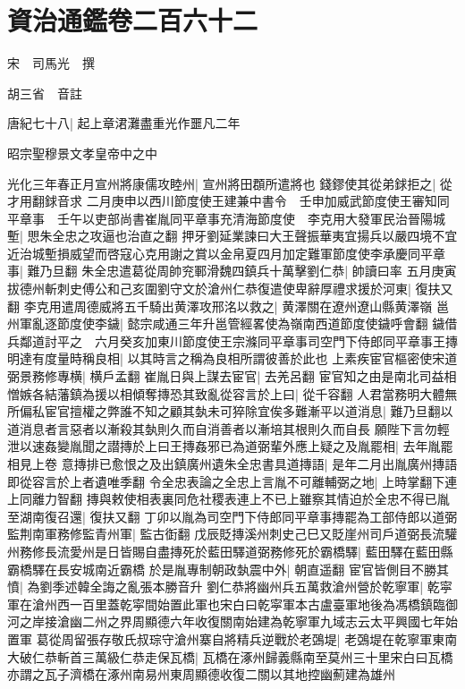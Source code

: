 \chapter{資治通鑑卷二百六十二}
宋　司馬光　撰

胡三省　音註

唐紀七十八|{
	起上章涒灘盡重光作噩凡二年}


昭宗聖穆景文孝皇帝中之中

光化三年春正月宣州將康儒攻睦州|{
	宣州將田頵所遣將也}
錢鏐使其從弟銶拒之|{
	從才用翻銶音求}
二月庚申以西川節度使王建兼中書令　壬申加威武節度使王審知同平章事　壬午以吏部尚書崔胤同平章事充清海節度使　李克用大發軍民治晉陽城塹|{
	愳朱全忠之攻逼也治直之翻}
押牙劉延業諫曰大王聲振華夷宜揚兵以嚴四境不宜近治城塹損威望而啓寇心克用謝之賞以金帛夏四月加定難軍節度使李承慶同平章事|{
	難乃旦翻}
朱全忠遣葛從周帥兖鄆滑魏四鎮兵十萬擊劉仁恭|{
	帥讀曰率}
五月庚寅拔德州斬刺史傅公和己亥圍劉守文於滄州仁恭復遣使卑辭厚禮求援於河東|{
	復扶又翻}
李克用遣周德威將五千騎出黄澤攻邢洺以救之|{
	黄澤關在遼州遼山縣黄澤嶺}
邕州軍亂逐節度使李鐬|{
	懿宗咸通三年升邕管經畧使為嶺南西道節度使鐬呼會翻}
鐬借兵鄰道討平之　六月癸亥加東川節度使王宗滌同平章事司空門下侍郎同平章事王摶明達有度量時稱良相|{
	以其時言之稱為良相所謂彼善於此也}
上素疾宦官樞密使宋道弼景務修專横|{
	横戶孟翻}
崔胤日與上謀去宦官|{
	去羌呂翻}
宦官知之由是南北司益相憎嫉各結藩鎮為援以相傾奪摶恐其致亂從容言於上曰|{
	從千容翻}
人君當務明大體無所偏私宦官擅權之弊誰不知之顧其埶未可猝除宜俟多難漸平以道消息|{
	難乃旦翻以道消息者言惡者以漸殺其埶則久而自消善者以漸培其根則久而自長}
願陛下言勿輕泄以速姦變胤聞之譛摶於上曰王摶姦邪已為道弼輩外應上疑之及胤罷相|{
	去年胤罷相見上卷}
意摶排已愈恨之及出鎮廣州遺朱全忠書具道摶語|{
	是年二月出胤廣州摶語即從容言於上者遺唯季翻}
令全忠表論之全忠上言胤不可離輔弼之地|{
	上時掌翻下連上同離力智翻}
摶與敕使相表裏同危社稷表連上不已上雖察其情迫於全忠不得已胤至湖南復召還|{
	復扶又翻}
丁卯以胤為司空門下侍郎同平章事摶罷為工部侍郎以道弼監荆南軍務修監青州軍|{
	監古衘翻}
戊辰貶摶溪州刺史己巳又貶崖州司戶道弼長流驩州務修長流愛州是日皆賜自盡摶死於藍田驛道弼務修死於霸橋驛|{
	藍田驛在藍田縣霸橋驛在長安城南近霸橋}
於是胤專制朝政埶震中外|{
	朝直遥翻}
宦官皆側目不勝其憤|{
	為劉季述韓全誨之亂張本勝音升}
劉仁恭將幽州兵五萬救滄州營於乾寧軍|{
	乾寜軍在滄州西一百里蓋乾寜間始置此軍也宋白曰乾寜軍本古盧臺軍地後為馮橋鎮臨御河之岸接滄幽二州之界周顯德六年收復關南始建為乾寧軍九域志云太平興國七年始置軍}
葛從周留張存敬氏叔琮守滄州寨自將精兵逆戰於老鵶堤|{
	老鵶堤在乾寧軍東南}
大破仁恭斬首三萬級仁恭走保瓦橋|{
	瓦橋在涿州歸義縣南至莫州三十里宋白曰瓦橋亦謂之瓦子濟橋在涿州南易州東周顯德收復二關以其地控幽薊建為雄州}
